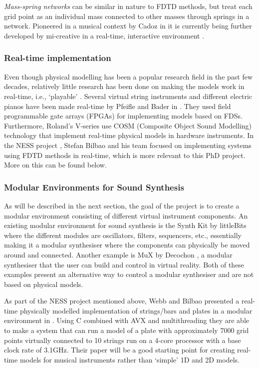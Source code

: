 \\
\\
\textit{Mass-spring networks} can be similar in nature to FDTD methods, but treat each grid point as an individual mass connected to other masses through springs in a network. Pioneered in a musical context by Cadoz in \cite{Cadoz1979, Cadoz1983, Cadoz1993} it is currently being further developed by mi-creative in a real-time, interactive environment \cite{Villeneuve2019, Leonard2019}. 

\subsubsection*{Real-time implementation}
Even though physical modelling has been a popular research field in the past few decades, relatively little research has been done on making the models work in real-time, i.e., `playable’ \cite{Mehes2016}. Several virtual string instruments and different electric pianos have been made real-time by Pfeifle and Bader in \cite{Pfeifle2012, Pfeifle2015, Pfeifle2017}. They used field programmable gate arrays (FPGAs) for implementing models based on FDSs. Furthermore, Roland’s V-series use COSM (Composite Object Sound Modelling) technology \cite{Bybee2019} that implement real-time physical models in hardware instruments. In the NESS project \cite{NESS2016}, Stefan Bilbao and his team focused on implementing systems using FDTD methods in real-time, which is more relevant to this PhD project. More on this can be found below.

\subsubsection*{Modular Environments for Sound Synthesis}

As will be described in the next section, the goal of the project is to create a modular environment consisting of different virtual instrument components. An existing modular environment for sound synthesis is the Synth Kit by littleBits \cite{littleBits2019} where the different modules are oscillators, filters, sequencers, etc., essentially making it a modular synthesiser where the components can physically be moved around and connected. Another example is MuX by Decochon \cite{MuX2019}, a modular synthesiser that the user can build and control in virtual reality. Both of these examples present an alternative way to control a modular synthesiser and are not based on physical models.

As part of the NESS project mentioned above, Webb and Bilbao presented a real-time physically modelled implementation of strings/bars and plates in a modular environment in \cite{Webb2015}. Using C combined with AVX and multithreading they are able to make a system that can run a model of a plate with approximately 7000 grid points virtually connected to 10 strings run on a 4-core processor with a base clock rate of 3.1GHz. Their paper will be a good starting point for creating real-time models for musical instruments rather than ‘simple’ 1D and 2D models.

